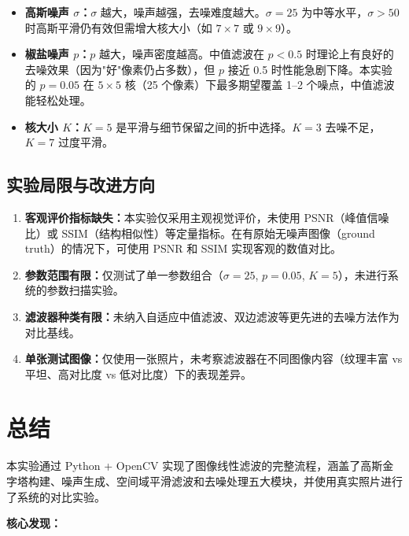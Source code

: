 \documentclass[12pt,a4paper]{ctexart}
\begin{document}
\begin{itemize}[leftmargin=*]
    \item \textbf{高斯噪声 $\sigma$：}$\sigma$ 越大，噪声越强，去噪难度越大。$\sigma=25$ 为中等水平，$\sigma>50$ 时高斯平滑仍有效但需增大核大小（如 $7\times7$ 或 $9\times9$）。
    \item \textbf{椒盐噪声 $p$：}$p$ 越大，噪声密度越高。中值滤波在 $p<0.5$ 时理论上有良好的去噪效果（因为"好"像素仍占多数），但 $p$ 接近 0.5 时性能急剧下降。本实验的 $p=0.05$ 在 $5\times5$ 核（25 个像素）下最多期望覆盖 1--2 个噪点，中值滤波能轻松处理。
    \item \textbf{核大小 $K$：}$K=5$ 是平滑与细节保留之间的折中选择。$K=3$ 去噪不足，$K=7$ 过度平滑。
\end{itemize}

\subsection{实验局限与改进方向}

\begin{enumerate}[leftmargin=*]
    \item \textbf{客观评价指标缺失：}本实验仅采用主观视觉评价，未使用 PSNR（峰值信噪比）或 SSIM（结构相似性）等定量指标。在有原始无噪声图像（ground truth）的情况下，可使用 PSNR 和 SSIM 实现客观的数值对比。
    \item \textbf{参数范围有限：}仅测试了单一参数组合（$\sigma=25$, $p=0.05$, $K=5$），未进行系统的参数扫描实验。
    \item \textbf{滤波器种类有限：}未纳入自适应中值滤波、双边滤波等更先进的去噪方法作为对比基线。
    \item \textbf{单张测试图像：}仅使用一张照片，未考察滤波器在不同图像内容（纹理丰富 vs 平坦、高对比度 vs 低对比度）下的表现差异。
\end{enumerate}

\newpage

\section{总结}

本实验通过 Python + OpenCV 实现了图像线性滤波的完整流程，涵盖了高斯金字塔构建、噪声生成、空间域平滑滤波和去噪处理五大模块，并使用真实照片进行了系统的对比实验。

\textbf{核心发现：}
\end{document}
